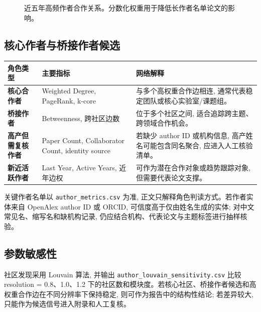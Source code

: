 \begin{figure}[!htbp]
  \centering
  \caption{近五年高频作者合作关系。分数化权重用于降低长作者名单论文的影响。}
\end{figure}

\subsection{核心作者与桥接作者候选}

\begin{tableblock}
\begin{tabularx}{\textwidth}{>{\bfseries}p{40mm}p{38mm}X}
\toprule
角色类型 & 主要指标 & 网络解释 \\
\midrule
核心合作者 & Weighted Degree, PageRank, k-core & 与多个高权重合作边相连, 通常代表稳定团队或核心实验室/课题组。 \\
桥接作者 & Betweenness, 跨社区边数 & 位于多个社区之间, 适合追踪跨主题、跨领域合作机会。 \\
高产但需复核作者 & Paper Count, Collaborator Count, identity source & 若缺少 author ID 或机构信息, 高产姓名可能包含同名聚合, 应进入人工核验清单。 \\
新近活跃作者 & Last Year, Active Years, 近年边权 & 可作为潜在合作对象或趋势跟踪对象, 但需要代表论文支撑。 \\
\bottomrule
\end{tabularx}
\end{tableblock}

关键作者名单以 \texttt{author\_metrics.csv} 为准, 正文只解释角色判读方式。若作者实体来自 OpenAlex author ID 或 ORCID, 可信度高于仅由姓名生成的实体; 对中文常见名、缩写名和缺机构记录, 仍应结合机构、代表论文与主题标签进行抽样核验。

\subsection{参数敏感性}

社区发现采用 Louvain 算法, 并输出 \texttt{author\_louvain\_sensitivity.csv} 比较 resolution = 0.8、1.0、1.2 下的社区数和模块度。若核心社区、桥接作者候选和高权重合作边在不同分辨率下保持稳定, 则可作为报告中的结构性结论; 若差异较大, 只能作为候选信号进入附录和人工复核。

\clearpage
